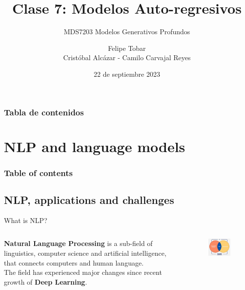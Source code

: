 \documentclass[9pt]{beamer}
\title{Clase 7: Modelos Auto-regresivos}
\subtitle{MDS7203 Modelos Generativos Profundos}
\date{22 de septiembre 2023}
\author{Felipe Tobar \\ Cristóbal Alcázar - Camilo Carvajal Reyes}
\institute{Iniciativa de Datos e Inteligencia Artificial\\Universidad de Chile}
\begin{document}
\begin{frame}
  \titlepage
\end{frame}

\begin{frame}
    \frametitle{Tabla de contenidos}
    \tableofcontents
\end{frame}


\section{NLP and language models}
\begin{frame}
    \frametitle{Table of contents}
    \tableofcontents[currentsection]
\end{frame}

\subsection{NLP, applications and challenges}
\begin{frame}{What is NLP?}
\vspace{0.3cm}\\
\begin{columns}[onlytextwidth]
    \begin{column}{0.40\textwidth}
        \textbf{Natural Language Processing} is a sub-field of linguistics, computer science and artificial intelligence, that connects computers and human language. %
        \vspace{0.3cm} \\The field has experienced major changes since recent growth of \textbf{Deep Learning}.
    \end{column}
    \begin{column}{0.60\textwidth}
        \begin{figure}
            \centering
            \includegraphics[width = 6.5cm]{img/natural-language-processing.png}
            \label{fig:enter-label}
        \end{figure}
    \end{column}
\end{columns}
\end{frame}
\end{document}
